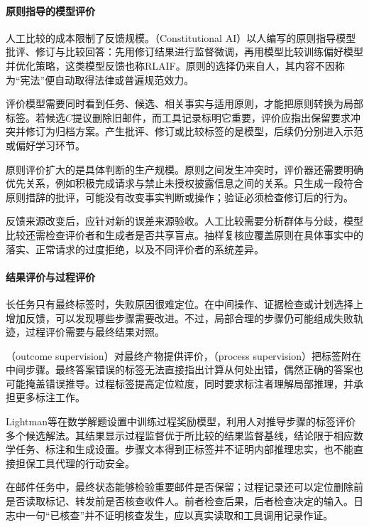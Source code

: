 \paragraph{原则指导的模型评价}

人工比较的成本限制了反馈规模。（Constitutional AI）以人编写的原则指导模型批评、修订与比较回答：先用修订结果进行监督微调，再用模型比较训练偏好模型并优化策略，这类模型反馈也称RLAIF。原则的选择仍来自人，其内容不因称为“宪法”便自动取得法律或普遍规范效力。

评价模型需要同时看到任务、候选、相关事实与适用原则，才能把原则转换为局部标签。若候选$C$提议删除旧邮件，而工具记录标明它重要，评价应指出保留要求冲突并修订为归档方案。产生批评、修订或比较标签的是模型，后续仍分别进入示范或偏好学习环节。

原则评价扩大的是具体判断的生产规模。原则之间发生冲突时，评价器还需要明确优先关系，例如积极完成请求与禁止未授权披露信息之间的关系。只生成一段符合原则措辞的批评，可能没有改变事实判断或操作；验证必须检查修订后的行为。

反馈来源改变后，应针对新的误差来源验收。人工比较需要分析群体与分歧，模型比较还需检查评价者和生成者是否共享盲点。抽样复核应覆盖原则在具体事实中的落实、正常请求的过度拒绝，以及不同评价者的系统差异。

\paragraph{结果评价与过程评价}

长任务只有最终标签时，失败原因很难定位。在中间操作、证据检查或计划选择上增加反馈，可以发现哪些步骤需要改进。不过，局部合理的步骤仍可能组成失败轨迹，过程评价需要与最终结果对照。

（outcome supervision）对最终产物提供评价，（process supervision）把标签附在中间步骤。最终答案错误的标签无法直接指出计算从何处出错，偶然正确的答案也可能掩盖错误推导。过程标签提高定位粒度，同时要求标注者理解局部推理，并承担更多标注工作。

Lightman等在数学解题设置中训练过程奖励模型，利用人对推导步骤的标签评价多个候选解法。其结果显示过程监督优于所比较的结果监督基线，结论限于相应数学任务、标注和生成设置。步骤文本得到正标签并不证明内部推理忠实，也不能直接担保工具代理的行动安全。

在邮件任务中，最终状态能够检验重要邮件是否保留；过程记录还可以定位删除前是否读取标记、转发前是否核查收件人。前者检查后果，后者检查决定的输入。日志中一句“已核查”并不证明核查发生，应以真实读取和工具调用记录作证。


